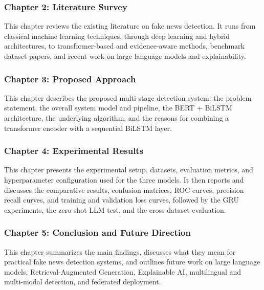 \subsubsection*{Chapter 2: Literature Survey}

This chapter reviews the existing literature on fake news detection. It runs from classical machine learning techniques, through deep learning and hybrid architectures, to transformer-based and evidence-aware methods, benchmark dataset papers, and recent work on large language models and explainability.

\subsubsection*{Chapter 3: Proposed Approach}

This chapter describes the proposed multi-stage detection system: the problem statement, the overall system model and pipeline, the BERT + BiLSTM architecture, the underlying algorithm, and the reasons for combining a transformer encoder with a sequential BiLSTM layer.

\subsubsection*{Chapter 4: Experimental Results}

This chapter presents the experimental setup, datasets, evaluation metrics, and hyperparameter configuration used for the three models. It then reports and discusses the comparative results, confusion matrices, ROC curves, precision--recall curves, and training and validation loss curves, followed by the GRU experiments, the zero-shot LLM test, and the cross-dataset evaluation.

\subsubsection*{Chapter 5: Conclusion and Future Direction}

This chapter summarizes the main findings, discusses what they mean for practical fake news detection systems, and outlines future work on large language models, Retrieval-Augmented Generation, Explainable AI, multilingual and multi-modal detection, and federated deployment.
